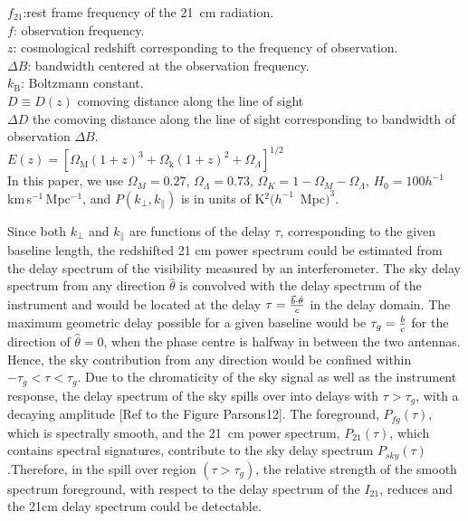 \documentclass[twocolumn]{emulateapj}
\newcommand{\thhat}{{\hat\theta}}
\begin{document}
    $f_{21}$:rest frame frequency of the 21~cm radiation.\\
    $f$: observation frequency.\\
    $z$: cosmological redshift corresponding to the frequency of observation.\\
     $\Delta B$: bandwidth centered at the observation frequency.\\
     $k_\textrm{B}$: Boltzmann constant.\\
     $D\equiv D(z)$ comoving distance along the line of sight\\
     $\Delta D$ the comoving distance along the line of sight corresponding to bandwidth of observation $\Delta B$.\\
    $E(z)= [\Omega_\textrm{M}(1+z)^3+\Omega_\textrm{k}(1+z)^2+\Omega_\Lambda]^{1/2}$ \\
    \indent In this paper, we use $\Omega_{M}=0.27$, $\Omega_{\Lambda}=0.73$, $\Omega_{K}=1-\Omega_{M}-\Omega_{\Lambda}$, $H_0=100 h^{-1}\,$km$\,$s$^{-1}\,$Mpc$^{-1}$, and $P(k_\perp,k_\parallel)$ is in units of K$^2 (h^{-1}$~Mpc$)^3$.
    
    \indent Since both $k_{\perp}$ and $k_{\parallel}$ are functions of the delay
    $\tau$, corresponding to the given baseline length, the redshifted 21 cm power
    spectrum could be estimated from the delay spectrum of the visibility measured
    by an interferometer. The sky delay spectrum from any direction $\thhat$ is
    convolved with the delay spectrum of the instrument and would be located at the
    delay $\tau = {\vec b \cdot \thhat \over c}$ %
     in the delay domain. The maximum geometric delay possible for a given baseline would be $\tau_{g} ={ b \over c }$ for the direction of $\thhat = 0$, when the phase centre is halfway in between the two antennas. %
     Hence, the sky contribution from any direction would be confined within
    $-\tau_{g}<\tau<\tau_{g}$. Due to the chromaticity of the sky signal as well as
    the instrument response, the delay spectrum of the sky spills over into delays
    with $\tau> \tau_{g}$, with a decaying amplitude [Ref to the Figure Parsons12].
    The foreground, $P_{fg}(\tau)$, which is spectrally smooth, and the 21~cm power
    spectrum, $P_{21}(\tau)$, which contains spectral signatures, contribute to the
    sky delay spectrum $P_{sky}(\tau)$.Therefore, in the spill over region
    $(\tau>\tau_{g})$, the relative strength of the smooth spectrum foreground,
    with respect to the delay spectrum of the $I_{21}$, reduces and the 21cm delay
    spectrum could be detectable.
    
\end{document}
